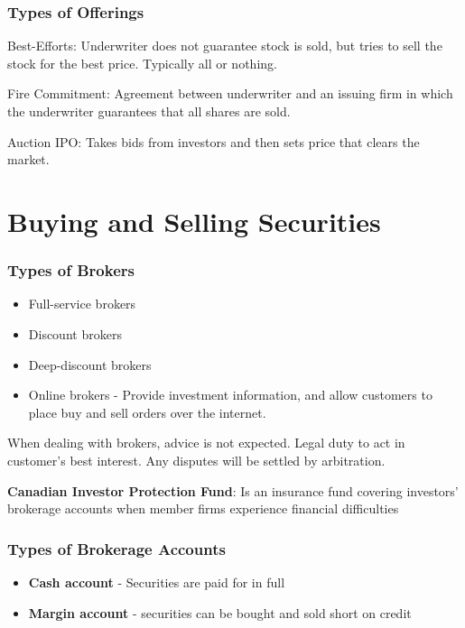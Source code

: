\documentclass[english, 12pt]{article}
\begin{document}
\subsubsection*{Types of Offerings}
\begin{defn}
Best-Efforts: Underwriter does not guarantee stock is sold, but tries to sell the stock for the best price. Typically all or nothing.
\end{defn}
\begin{defn}
Fire Commitment: Agreement between underwriter and an issuing firm in which the underwriter guarantees that all shares are sold.
\end{defn}
\begin{defn}
Auction IPO: Takes bids from investors and then sets price that clears the market.
\end{defn}

\section{Buying and Selling Securities}
\subsubsection*{Types of Brokers}
\begin{itemize}
\item Full-service brokers
\item Discount brokers
\item Deep-discount brokers
\item Online brokers - Provide investment information, and allow customers to place buy and sell orders over the internet.
\end{itemize}
\begin{qte}
When dealing with brokers, advice is not expected. Legal duty to act in customer's best interest. Any disputes will be settled by arbitration.
\end{qte}
\begin{defn}
\textbf{Canadian Investor Protection Fund}: Is an insurance fund covering investors' brokerage accounts when member firms experience financial difficulties
\end{defn}
\subsubsection*{Types of Brokerage Accounts}
\begin{itemize}
\item \textbf{Cash account} - Securities are paid for in full
\item \textbf{Margin account} - securities can be bought and sold short on credit
\end{itemize}
\end{document}
